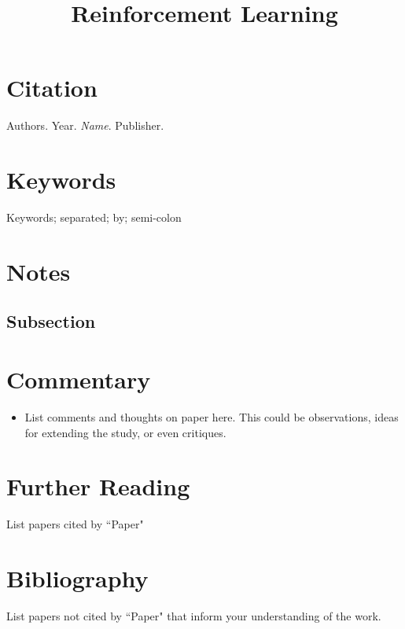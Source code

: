 \documentclass{article}
\title{Reinforcement Learning}
\begin{document}
\maketitle

\section{Citation}
Authors. Year. \textit{Name}. Publisher.

\section{Keywords}
Keywords; separated; by; semi-colon

\section{Notes}
\subsection{Subsection}

\section{Commentary}
\begin{itemize}
    \item List comments and thoughts on paper here. This could be observations, ideas for extending the study, or even critiques.
\end{itemize}

\section{Further Reading}
List papers cited by ``Paper"

\section{Bibliography}
List papers not cited by ``Paper" that inform your understanding of the work.
\end{document}
